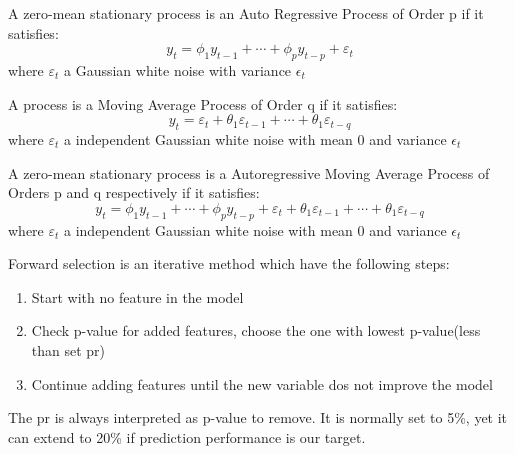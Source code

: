 \begin{defn}\label{Definition of AR(p)}
A zero-mean stationary process is an Auto Regressive Process of Order p if it satisfies:
\begin{equation}
y_t=\phi_1y_{t-1}+\cdots+\phi_py_{t-p}+\varepsilon_t
\end{equation}
where $\varepsilon_t$ a Gaussian white noise with variance $\epsilon_t$
\end{defn}

\begin{defn}\label{Definition of MA(q)}
A process is a Moving Average Process of Order q if it satisfies:
\begin{equation}
y_t=\varepsilon_t+\theta_1\varepsilon_{t-1}+\cdots+\theta_1\varepsilon_{t-q}
\end{equation}
where $\varepsilon_t$ a independent Gaussian white noise with mean 0 and variance $\epsilon_t$
\end{defn}

\begin{defn}\label{Definition of ARMA(p,q)}
A zero-mean stationary process is a Autoregressive Moving Average Process of Orders p and q respectively if it satisfies:
\begin{equation}
y_t=\phi_1y_{t-1}+\cdots+\phi_py_{t-p}+\varepsilon_t+\theta_1\varepsilon_{t-1}+\cdots+\theta_1\varepsilon_{t-q}
\end{equation}
where $\varepsilon_t$ a independent Gaussian white noise with mean 0 and variance $\epsilon_t$
\end{defn}

\begin{defn}\label{Definition of Stepwise Forward Selection}
Forward selection is an iterative method which have the following steps:
\begin{enumerate}
   \item Start with no feature in the model
   \item Check p-value for added features, choose the one with lowest p-value(less than set pr)
   \item Continue adding features until the new variable dos not improve the model  
\end{enumerate}
The pr is always interpreted as p-value to remove. It is normally set to 5\%, yet it can extend to 20\% if prediction performance is our target. 
\end{defn}


